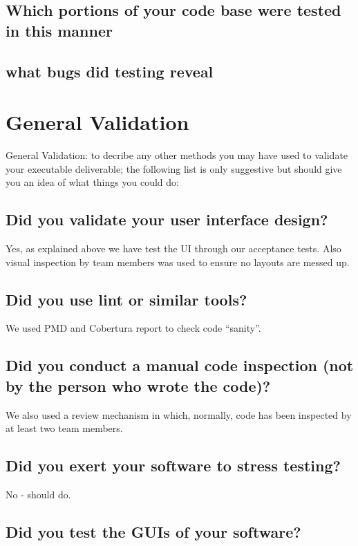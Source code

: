 \documentclass[10pt]{article}
\begin{document}
\subsection{Which portions of your code base were tested in this manner}

\subsection{what bugs did testing reveal}

\section{General Validation}
General Validation: to decribe any other methods you may have used to validate your executable deliverable; the following list is only suggestive but should give you an idea of what things you could do:

\subsection{Did you validate your user interface design?}

Yes, as explained above we have test the UI through our acceptance tests. Also visual inspection by team members was used to ensure no layouts are messed up.

\subsection{Did you use lint or similar tools?}

We used PMD and Cobertura report to check code ``sanity''.

\subsection{Did you conduct a manual code inspection (not by the person who wrote the code)?}

We also used a review mechanism in which, normally, code has been inspected by at least two team members.

\subsection{Did you exert your software to stress testing?}

No - should do.

\subsection{Did you test the GUIs of your software?}
\end{document}
